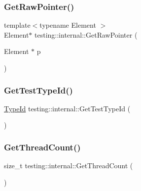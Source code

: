 \mbox{\label{namespacetesting_1_1internal_a4d17b114b61b805ac5f37e9c26e29e55}} 
\subsubsection{\texorpdfstring{GetRawPointer()}{GetRawPointer()}\hspace{0.1cm}{\footnotesize\ttfamily [2/2]}}
{\footnotesize\ttfamily template$<$typename Element $>$ \\
Element$\ast$ testing\+::internal\+::\+Get\+Raw\+Pointer (\begin{DoxyParamCaption}\item[{Element $\ast$}]{p }\end{DoxyParamCaption})\hspace{0.3cm}{\ttfamily [inline]}}

\mbox{\label{namespacetesting_1_1internal_ad0d66d56ead224263cd100c1d6bfc562}} 
\subsubsection{\texorpdfstring{GetTestTypeId()}{GetTestTypeId()}}
{\footnotesize\ttfamily \mbox{\hyperlink{namespacetesting_1_1internal_ab1114197d3c657d8b7f8e0c5caa12d00}{Type\+Id}} testing\+::internal\+::\+Get\+Test\+Type\+Id (\begin{DoxyParamCaption}{ }\end{DoxyParamCaption})}

\mbox{\label{namespacetesting_1_1internal_a3b9b3649cd04558bf46c75de52a7ef34}} 
\subsubsection{\texorpdfstring{GetThreadCount()}{GetThreadCount()}}
{\footnotesize\ttfamily size\+\_\+t testing\+::internal\+::\+Get\+Thread\+Count (\begin{DoxyParamCaption}{ }\end{DoxyParamCaption})}

